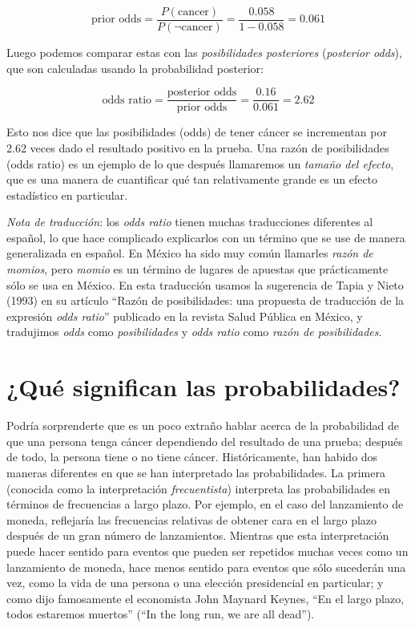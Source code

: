 \documentclass[
  12pt,
]{book}
\begin{document}
\[
\text{prior odds} = \frac{P(\text{cancer})}{P(\neg \text{cancer})} =\frac{0.058}{1 - 0.058} = 0.061
\]

Luego podemos comparar estas con las \emph{posibilidades posteriores} (\emph{posterior odds}), que son calculadas usando la probabilidad posterior:

\[
\text{odds ratio} = \frac{\text{posterior odds}}{\text{prior odds}} = \frac{0.16}{0.061} = 2.62
\]

Esto nos dice que las posibilidades (odds) de tener cáncer se incrementan por 2.62 veces dado el resultado positivo en la prueba. Una razón de posibilidades (odds ratio) es un ejemplo de lo que después llamaremos un \emph{tamaño del efecto}, que es una manera de cuantificar qué tan relativamente grande es un efecto estadístico en particular.

\emph{Nota de traducción}: los \emph{odds ratio} tienen muchas traducciones diferentes al español, lo que hace complicado explicarlos con un término que se use de manera generalizada en español. En México ha sido muy común llamarles \emph{razón de momios}, pero \emph{momio} es un término de lugares de apuestas que prácticamente sólo se usa en México. En esta traducción usamos la sugerencia de Tapia y Nieto (1993) en su artículo ``Razón de posibilidades: una propuesta de traducción de la expresión \emph{odds ratio}'' publicado en la revista Salud Pública en México, y tradujimos \emph{odds} como \emph{posibilidades} y \emph{odds ratio} como \emph{razón de posibilidades}.

\hypertarget{quuxe9-significan-las-probabilidades}{%
\section{¿Qué significan las probabilidades?}\label{quuxe9-significan-las-probabilidades}}

Podría sorprenderte que es un poco extraño hablar acerca de la probabilidad de que una persona tenga cáncer dependiendo del resultado de una prueba; después de todo, la persona tiene o no tiene cáncer. Históricamente, han habido dos maneras diferentes en que se han interpretado las probabilidades. La primera (conocida como la interpretación \emph{frecuentista}) interpreta las probabilidades en términos de frecuencias a largo plazo. Por ejemplo, en el caso del lanzamiento de moneda, reflejaría las frecuencias relativas de obtener cara en el largo plazo después de un gran número de lanzamientos. Mientras que esta interpretación puede hacer sentido para eventos que pueden ser repetidos muchas veces como un lanzamiento de moneda, hace menos sentido para eventos que sólo sucederán una vez, como la vida de una persona o una elección presidencial en particular; y como dijo famosamente el economista John Maynard Keynes, ``En el largo plazo, todos estaremos muertos'' (``In the long run, we are all dead'').
\end{document}
